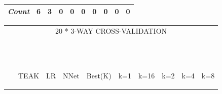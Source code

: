 \begin{figure*}[!t]
\begin{tabular}{lccccccccc|}
\rowcolor{DarkGray}\em Count	&	6	&	3	&	0	&	0	&	0	&	0	&	0	&	0	&	0	\\
\hline
\end{tabular}
\begin{tabular}{lccccccccc}
\multicolumn{10}{c}{20 * 3-WAY CROSS-VALIDATION}\\~\\~\\
&	\begin{sideways}\parbox{9mm}{TEAK}\end{sideways}	&	\begin{sideways}\parbox{9mm}{LR}\end{sideways}	&	\begin{sideways}\parbox{9mm}{NNet}\end{sideways}	&	\begin{sideways}\parbox{9mm}{Best(K)}\end{sideways}	&	\begin{sideways}\parbox{9mm}{k=1}\end{sideways}	&	\begin{sideways}\parbox{9mm}{k=16}\end{sideways}	&	\begin{sideways}\parbox{9mm}{k=2}\end{sideways}	&	\begin{sideways}\parbox{9mm}{k=4}\end{sideways}	&	\begin{sideways}\parbox{9mm}{k=8}\end{sideways}	\\\hline

\end{tabular}
\end{figure*}
